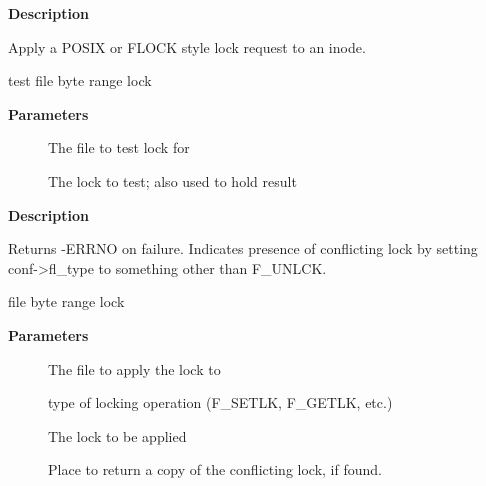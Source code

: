 \documentclass[a4paper,8pt,english]{sphinxmanual}
\begin{document}
\textbf{Description}

Apply a POSIX or FLOCK style lock request to an inode.

\begin{fulllineitems}
\label{filesystems/index:c.vfs_test_lock}
test file byte range lock

\end{fulllineitems}


\textbf{Parameters}
\begin{description}
\item[{}] \leavevmode
The file to test lock for

\item[{}] \leavevmode
The lock to test; also used to hold result

\end{description}

\textbf{Description}

Returns -ERRNO on failure.  Indicates presence of conflicting lock by
setting conf-\textgreater{}fl\_type to something other than F\_UNLCK.

\begin{fulllineitems}
\label{filesystems/index:c.vfs_lock_file}
file byte range lock

\end{fulllineitems}


\textbf{Parameters}
\begin{description}
\item[{}] \leavevmode
The file to apply the lock to

\item[{}] \leavevmode
type of locking operation (F\_SETLK, F\_GETLK, etc.)

\item[{}] \leavevmode
The lock to be applied

\item[{}] \leavevmode
Place to return a copy of the conflicting lock, if found.

\end{description}
\end{document}
